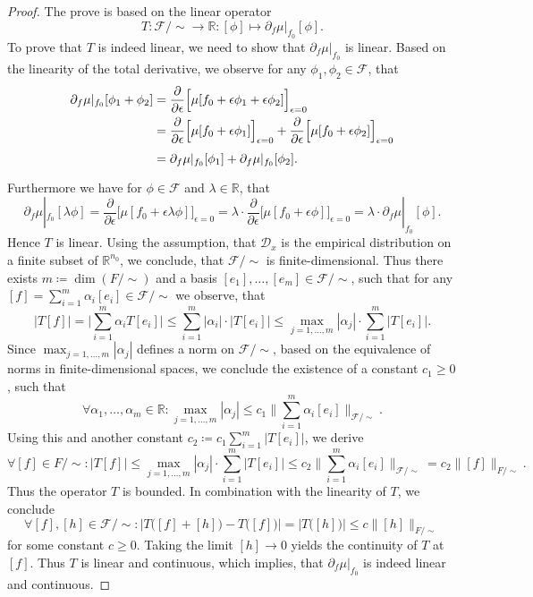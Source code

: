 \documentclass[11pt, a4paper]{article}
\newcommand{\R}{\mathbb{R}}
\newcommand{\D}{\mathcal{D}}
\newcommand{\F}{\mathcal{F}}
\begin{document}
\begin{proof}
The prove is based on the linear operator
\[ T : \F / {\sim} \to \R : [\phi] \mapsto \partial_f \mu |_{f_0} [\phi]. \]
To prove that $T$ is indeed linear, we need to show that $\partial_f \mu |_{f_0}$ is linear. Based on the linearity of the total derivative, we observe for any $\phi_1, \phi_2 \in \F$, that
\[ \begin{split}
\partial_f \mu |_{f_0} [\phi_1 + \phi_2] 
&= \frac{\partial}{\partial \epsilon} \Big [ \mu[f_0+\epsilon \phi_1 + \epsilon \phi_2 ] \Big ]_{\epsilon=0} \\\
&= \frac{\partial}{\partial \epsilon} \Big [ \mu[f_0+\epsilon \phi_1] \Big ]_{\epsilon=0} + \frac{\partial}{\partial \epsilon} \Big [ \mu[f_0+\epsilon \phi_2] \Big ]_{\epsilon=0} \\\
\textcolor{white}{\Big |} &= \partial_f \mu |_{f_0} [\phi_1] + \partial_f \mu |_{f_0} [\phi_2].
\end{split} \]
Furthermore we have for $\phi \in \F$ and $\lambda \in \R$, that
\[ \partial_f \mu |_{f_0} [\lambda \phi] = \frac{\partial}{\partial \epsilon} \Big [ \mu[f_0+\epsilon \lambda \phi ] \Big ]_{\epsilon=0} = \lambda \cdot \frac{\partial}{\partial \epsilon} \Big [ \mu[f_0+\epsilon \phi ] \Big ]_{\epsilon=0} = \lambda \cdot \partial_f \mu |_{f_0} [\phi]. \]
Hence $T$ is linear. Using the assumption, that $\D_x$ is the empirical distribution on a finite subset of $\R^{n_0}$, we conclude, that $\F /{\sim}$ is finite-dimensional. Thus there exists $m \coloneq \dim(F/{\sim})$ and a basis $[e_1], \dots, [e_m] \in \F / {\sim}$, such that for any $[f] = \sum_{i=1}^{m}\alpha_i[e_i] \in \F/{\sim}$ we observe, that
\[ \big | T[f] \big | = \Big | \sum_{i=1}^{m} \alpha_iT[e_i] \Big | \leq \sum_{i=1}^{m} \big | \alpha_i \big | \cdot \big | T[e_i] \big | \leq \max_{j=1,\dots,m} | \alpha_j | \cdot \sum_{i=1}^{m} \big | T[e_i] \big |. \]
Since $\max_{j=1,\dots,m} | \alpha_j |$ defines a norm on $\F/{\sim}$, based on the equivalence of norms in finite-dimensional spaces, we conclude the existence of a constant $c_1 \geq 0$, such that
\[ \forall \alpha_1, \dots, \alpha_m \in \R : \max_{j=1,\dots,m} | \alpha_j | \leq c_1 \Big \| \sum_{i=1}^{m} \alpha_i [e_i] \Big \|_{\F/{\sim}}. \]
Using this and another constant $c_2 \coloneq c_1 \sum_{i=1}^{m} \big | T [e_i] \big |$, we derive
\[ \forall [f] \in F/{\sim} : \big | T [f] \big | \leq \max_{j=1,\dots,m} | \alpha_j | \cdot \sum_{i=1}^{m} \big | T[e_i] \big | \leq c_2 \Big \| \sum_{i=1}^{m} \alpha_i [e_i] \Big \|_{\F/{\sim}} = c_2 \big \| [f] \big \|_{F/{\sim}}. \]
Thus the operator $T$ is bounded. In combination with the linearity of $T$, we conclude
\[ \forall [f], [h] \in \F/{\sim} : \Big | T \big ( [f] + [h] \big ) - T\big ( [f] \big ) \Big | = \Big | T\big ([h] \big ) \Big | \leq c \big \| [h] \big \|_{F/{\sim}} \]
for some constant $c \geq 0$. Taking the limit $[h] \to 0$ yields the continuity of $T$ at $[f]$. Thus $T$ is linear and continuous, which implies, that $\partial_f\mu |_{f_0}$ is indeed linear and continuous.
\end{proof}
\end{document}
